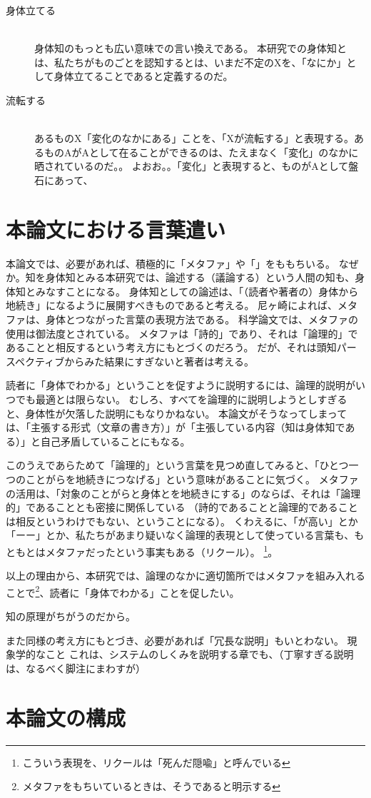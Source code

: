 \begin{description}
  \item [身体立てる]\mbox{}\\
  身体知のもっとも広い意味での言い換えである。  
  本研究での身体知とは、私たちがものごとを認知するとは、いまだ不定のXを、「なにか」として身体立てることであると定義するのだ。  
  \item[流転する]\mbox{}\\
  あるものX「変化のなかにある」ことを、「Xが流転する」と表現する。あるものAがAとして在ることができるのは、たえまなく「変化」のなかに晒されているのだ。。
  よおお。。「変化」と表現すると、ものがAとして盤石にあって、
  
\end{description}

\section{本論文における言葉遣い}
本論文では、必要があれば、積極的に「メタファ」や「」をももちいる。
なぜか。知を身体知とみる本研究では、論述する（議論する）という人間の知も、身体知とみなすことになる。
身体知としての論述は、「（読者や著者の）身体から地続き」になるように展開すべきものであると考える。
尼ヶ崎\cite{amagasaki}によれば、メタファは、身体とつながった言葉の表現方法である。
科学論文では、メタファの使用は御法度とされている。
メタファは「詩的」であり、それは「論理的」であることと相反するという考え方にもとづくのだろう。
だが、それは頭知パースペクティブからみた結果にすぎないと著者は考える。

読者に「身体でわかる」ということを促すように説明するには、論理的説明がいつでも最適とは限らない。
むしろ、すべてを論理的に説明しようとしすぎると、身体性が欠落した説明にもなりかねない。
本論文がそうなってしまっては、「主張する形式（文章の書き方）」が「主張している内容（知は身体知である）」と自己矛盾していることにもなる。


このうえであらためて「論理的」という言葉を見つめ直してみると、「ひとつ一つのことがらを地続きにつなげる」という意味があることに気づく。
メタファの活用は、「対象のことがらと身体とを地続きにする」のならば、それは「論理的」であることとも密接に関係している
（詩的であることと論理的であることは相反というわけでもない、ということになる）。
くわえるに、「が高い」とか「ーー」とか、私たちがあまり疑いなく論理的表現として使っている言葉も、もともとはメタファだったという事実もある（リクール）。
\footnote{こういう表現を、リクールは「死んだ隠喩」と呼んでいる}。

以上の理由から、本研究では、論理のなかに適切箇所ではメタファを組み入れることで\footnote{メタファをもちいているときは、そうであると明示する}、読者に「身体でわかる」ことを促したい。

知の原理がちがうのだから。

また同様の考え方にもとづき、必要があれば「冗長な説明」もいとわない。
現象学的なこと
これは、システムのしくみを説明する章でも、（丁寧すぎる説明は、なるべく脚注にまわすが）


\section{本論文の構成}





